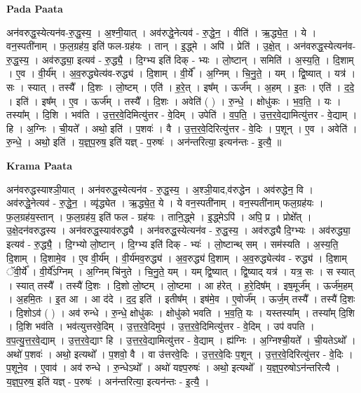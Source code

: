 \documentclass[17pt]{extarticle}
\begin{document}
\textbf{Pada Paata} \newline

अन॑वरुद्ध॒स्येत्यन॑व-रु॒द्ध॒स्य॒ । अ॒श्नी॒यात् । अव॑रुद्धे॒नेत्यव॑ - रु॒द्धे॒न॒ । वीति॑ । ऋ॒द्ध्ये॒त॒ । ये । वन॒स्पती॑नाम् । फ॒ल॒ग्रह॑य॒ इति॑ फल-ग्रह॑यः । तान् । इ॒द्ध्मे । अपि॑ । प्रेति॑ । उ॒क्षे॒त् । अन॑वरुद्ध॒स्येत्यन॑व-रु॒द्ध॒स्य॒ । अव॑रुद्ध्या॒ इत्यव॑ - रु॒द्ध्यै॒ । दि॒ग्भ्य इति॑ दिक् - भ्यः । लो॒ष्टान् । समिति॑ । अ॒स्य॒ति॒ । दि॒शाम् । ए॒व । वी॒र्य᳚म् । अ॒व॒रुद्ध्येत्य॑व-रुद्ध्य॑ । दि॒शाम् । वी॒र्ये᳚ । अ॒ग्निम् । चि॒नु॒ते॒ । यम् । द्वि॒ष्यात् । यत्र॑ । सः । स्यात् । तस्यै᳚ । दि॒शः । लो॒ष्टम् । एति॑ । ह॒रे॒त् । इष᳚म् । ऊर्ज᳚म् । अ॒हम् । इ॒तः । एति॑ । द॒दे॒ । इति॑ । इष᳚म् । ए॒व । ऊर्ज᳚म् । तस्यै᳚ । दि॒शः । अवेति॑ ( ) । रु॒न्धे॒ । क्षोधु॑कः । भ॒व॒ति॒ । यः । तस्या᳚म् । दि॒शि । भव॑ति । उ॒त्त॒र॒वे॒दिमित्यु॑त्तर - वे॒दिम् । उपेति॑ । व॒प॒ति॒ । उ॒त्त॒र॒वे॒द्यामित्यु॑त्तर - वे॒द्याम् । हि । अ॒ग्निः । ची॒यते᳚ । अथो॒ इति॑ । प॒शवः॑ । वै । उ॒त्त॒र॒वे॒दिरित्यु॑त्तर - वे॒दिः । प॒शून् । ए॒व । अवेति॑ । रु॒न्धे॒ । अथो॒ इति॑ । य॒ज्ञ्॒प॒रुष॒ इति॑ यज्ञ् - प॒रुषः॑ । अन॑न्तरित्या॒ इत्यन॑न्तः - इ॒त्यै॒ ॥  \newline


\textbf{Krama Paata} \newline

अन॑वरुद्धस्याश्ञी॒यात् । अन॑वरुद्ध॒स्येत्यन॑व - रु॒द्ध॒स्य॒ । अ॒श्ञी॒याद,व॑रुद्धेन । अव॑रुद्धेन॒ वि । अव॑रुद्धे॒नेत्यव॑ - रु॒द्धे॒न॒ । व्यृ॑द्ध्येत । ऋ॒द्ध्ये॒त॒ ये । ये वन॒स्पती॑नाम् । वन॒स्पती॑नाम् फल॒ग्रह॑यः । फ॒ल॒ग्रह॑य॒स्तान् । फ॒ल॒ग्रह॑य॒ इति॑ फल - ग्रह॑यः । तानि॒द्ध्मे । इ॒द्ध्मेऽपि॑ । अपि॒ प्र । प्रोक्षे᳚त् । उ॒क्षे॒दन॑वरुद्धस्य । अन॑वरुद्ध॒स्याव॑रुद्ध्यै । अन॑वरुद्ध॒स्येत्यन॑व - रु॒द्ध॒स्य॒ । अव॑रुद्ध्यै दि॒ग्भ्यः । अव॑रुद्ध्या॒ इत्यव॑ - रु॒द्ध्यै॒ । दि॒ग्भ्यो लो॒ष्टान् । दि॒ग्भ्य इति॑ दिक् - भ्यः॑ । लो॒ष्टान्थ् सम् । सम॑स्यति । अ॒स्य॒ति॒ दि॒शाम् । दि॒शामे॒व । ए॒व वी॒र्य᳚म् । वी॒र्य॑मव॒रुद्ध्य॑ । अ॒व॒रुद्ध्य॑ दि॒शाम् । अ॒व॒रुद्ध्येत्य॑व - रुद्ध्य॑ । दि॒शाम् ॅवी॒र्ये᳚ । वी॒र्ये᳚ऽग्निम् । अ॒ग्निम् चि॑नुते । चि॒नु॒ते॒ यम् । यम् द्वि॒ष्यात् । द्वि॒ष्याद् यत्र॑ । यत्र॒ सः । स स्यात् । स्यात् तस्यै᳚ । तस्यै॑ दि॒शः । दि॒शो लो॒ष्टम् । लो॒ष्टमा । आ ह॑रेत् । ह॒रे॒दिष᳚म् । इष॒मूर्ज᳚म् । ऊर्ज॑म॒हम् । अ॒हमि॒तः । इ॒त आ । आ द॑दे । द॒द॒ इति॑ । इतीष᳚म् । इष॑मे॒व । ए॒वोर्ज᳚म् । ऊर्ज॒म् तस्यै᳚ । तस्यै॑ दि॒शः । दि॒शोऽव॑ ( ) । अव॑ रुन्धे । रु॒न्धे॒ क्षोधु॑कः । क्षोधु॑को भवति । भ॒व॒ति॒ यः । यस्तस्या᳚म् । तस्या᳚म् दि॒शि । दि॒शि भव॑ति । भव॑त्युत्तरवे॒दिम् । उ॒त्त॒र॒वे॒दिमुप॑ । उ॒त्त॒र॒वे॒दिमित्यु॑त्तर - वे॒दिम् । उप॑ वपति । व॒प॒त्यु॒त्त॒र॒वे॒द्याम् । उ॒त्त॒र॒वे॒द्याꣳ हि । उ॒त्त॒र॒वे॒द्यामित्यु॑त्तर - वे॒द्याम् । ह्य॑ग्निः । अ॒ग्निश्ची॒यते᳚ । ची॒यतेऽथो᳚ । अथो॑ प॒शवः॑ । अथो॒ इत्यथो᳚ । प॒शवो॒ वै । वा उ॑त्तरवे॒दिः । उ॒त्त॒र॒वे॒दिः प॒शून् । उ॒त्त॒र॒वे॒दिरित्यु॑त्तर - वे॒दिः । प॒शूने॒व । ए॒वाव॑ । अव॑ रुन्धे । रु॒न्धेऽथो᳚ । अथो॑ यज्ञ्प॒रुषः॑ । अथो॒ इत्यथो᳚ । य॒ज्ञ्॒प॒रुषोऽन॑न्तरित्यै । य॒ज्ञ्॒प॒रुष॒ इति॑ यज्ञ् - प॒रुषः॑ । अन॑न्तरित्या॒ इत्यन॑न्तः - इ॒त्यै॒ । \newline
\end{document}
